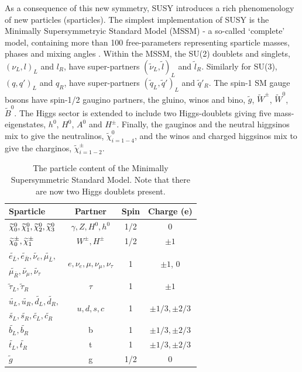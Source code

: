 As a consequence of this new symmetry, SUSY introduces a rich phenomenology of
new particles (sparticles). The simplest implementation of SUSY is the
Minimally
Supersymmetryic Standard Model (MSSM) \cite{Martin:1997ns} - a so-called
`complete' model, containing more than 100 free-parameters representing
sparticle masses, phases and mixing angles \cite{Dimopoulos:1995ju}.
Within the MSSM, the SU(2) doublets and singlets, $(\nu_L, l)_L$ and $l_R$,
have super-partners $(\tilde{\nu}_L, \tilde{l})_L$ and $\tilde{l}_R$. Similarly
for SU(3), $(q, q')_L$ and $q_R$,
have super-partners $(\tilde{q}_L, \tilde{q}')_L$ and $\tilde{q}'_R$. The
spin-1 SM gauge bosons have spin-1/2 gaugino partners, the gluino, winos and
bino, $\tilde{g}$, $\tilde{W}^{\pm}$, $\tilde{W}^0$, $\tilde{B}^0$.
The Higgs sector is extended to include
two Higgs-doublets giving five mass-eigenstates, $h^0$, $H^0$, $A^0$ and
$H^{\pm}$. Finally, the gauginos and the neutral higgsinos mix to give the
neutralinos, $\tilde{\chi}^0_{i=1-4}$, and the winos and charged higgsinos mix
to give the charginos, $\tilde{\chi}^{\pm}_{i=1-2}$.

\begin{table}[h!]
  \caption{The particle content of the Minimally Supersymmetric Standard
  Model. Note that there are now two Higgs doublets present.\label{tab:susy_particles}}
  \centering
  \small
  \begin{tabular}{ lccc }
    \hline
    \hline
    Sparticle         & Partner  & Spin & Charge (e) \\
    \hline
    $\widetilde{\chi}^{0}_0, \widetilde{\chi}^{0}_1, \widetilde{\chi}^{0}_2, \widetilde{\chi}^{0}_3$ & $\gamma, Z, H^0, h^0$ & 1/2 & 0 \\  
    $\widetilde{\chi}^{\pm}_0, \widetilde{\chi}^{\pm}_1$ & $W^{\pm}, H^{\pm}$ & 1/2 & $\pm1$ \\
    
    $\widetilde{e_{\bar{L}}}, \widetilde{e_{\bar{R}}},
    \widetilde{\nu_e},
    \widetilde{\mu_{\bar{L}}},$ &\multirow{2}{*}{$e, \nu_{e}, \mu, \nu_{\mu}, \nu_{\tau}$}&\multirow{2}{*}{1} & \multirow{2}{*}{$\pm 1$, 0} \\
    $ \widetilde{\mu_{\bar{R}}}, \widetilde{\nu_{\mu}},
    \widetilde{\nu_{\tau}}$ &&&\\
    
    $\widetilde{\tau}_L, \widetilde{\tau}_R$ & $\tau$ & 1  & $\pm 1$ \\
    

    $\widetilde{u_L}, \widetilde{u_R}, \widetilde{d_L},
    \widetilde {d_R},$& \multirow{2}{*}{$u, d, s, c$} & \multirow{2}{*}{1} & \multirow{2}{*}{$\pm 1/3, \pm 2/3$} \\
    $\widetilde{s_L}, \widetilde{s_R}, \widetilde{c_L}, \widetilde{c_R}$ &&& \\
    $\widetilde{b_L}, \widetilde{b_R}$ & b & 1 & $\pm 1/3, \pm 2/3$ \\
    $\widetilde{t_L}, \widetilde{t_R}$ & t & 1 & $\pm 1/3, \pm 2/3$ \\
    $\widetilde{g}$ & g & 1/2 & 0 \\
    \hline
    \hline
  \end{tabular}
\end{table}

